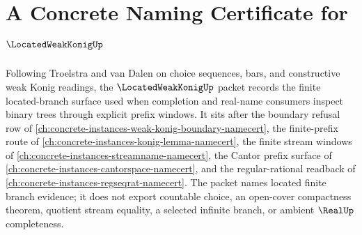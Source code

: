 \chapter{A Concrete Naming Certificate for $\LocatedWeakKonigUp$}
\label{ch:concrete-instances-located-weak-konig-namecert}

Following Troelstra and van Dalen on choice sequences, bars, and constructive weak Konig readings, the $\LocatedWeakKonigUp$ packet records the finite located-branch surface used when completion and real-name consumers inspect binary trees through explicit prefix windows. It sits after the boundary refusal row of \autoref{ch:concrete-instances-weak-konig-boundary-namecert}, the finite-prefix route of \autoref{ch:concrete-instances-konig-lemma-namecert}, the finite stream windows of \autoref{ch:concrete-instances-streamname-namecert}, the Cantor prefix surface of \autoref{ch:concrete-instances-cantorspace-namecert}, and the regular-rational readback of \autoref{ch:concrete-instances-regseqrat-namecert}. The packet names located finite branch evidence; it does not export countable choice, an open-cover compactness theorem, quotient stream equality, a selected infinite branch, or ambient $\RealUp$ completeness.

